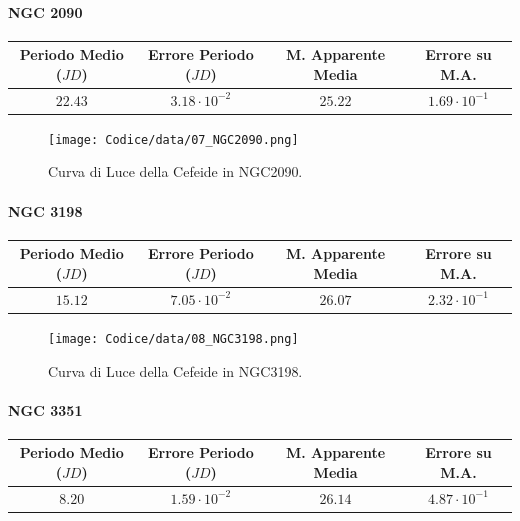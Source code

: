 \documentclass{article}
\newcommand{\e}[1]{\cdot 10^{#1}} %
\begin{document}
\paragraph{NGC 2090}
\begin{center}
  \begin{tabular}{cccc}
  \toprule
  Periodo Medio ($JD$) & Errore Periodo ($JD$) & M. Apparente Media &
                                                                  Errore
                                                                      su
                                                                      M.A. \\
  \midrule
  $22.43$ & $3.18\e{-2}$ & $25.22$ & $1.69\e{-1}$ \\
  \bottomrule
 \end{tabular}
\end{center}

\begin{figure}[H]
  \centering
  \texttt{[image: Codice/data/07\_NGC2090.png]}
  \caption{Curva di Luce della Cefeide in NGC2090.}
\end{figure}

\paragraph{NGC 3198}
\begin{center}
  \begin{tabular}{cccc}
  \toprule
  Periodo Medio ($JD$) & Errore Periodo ($JD$) & M. Apparente Media &
                                                                  Errore
                                                                      su
                                                                      M.A. \\
  \midrule
  $15.12$ & $7.05\e{-2}$ & $26.07$ & $2.32\e{-1}$ \\
  \bottomrule
 \end{tabular}
\end{center}

\begin{figure}[H]
  \centering
  \texttt{[image: Codice/data/08\_NGC3198.png]}
  \caption{Curva di Luce della Cefeide in NGC3198.}
\end{figure}

\paragraph{NGC 3351}
\begin{center}
  \begin{tabular}{cccc}
  \toprule
  Periodo Medio ($JD$) & Errore Periodo ($JD$) & M. Apparente Media &
                                                                  Errore
                                                                      su
                                                                      M.A. \\
  \midrule
  $8.20$ & $1.59\e{-2}$ & $26.14$ & $4.87\e{-1}$ \\
  \bottomrule
 \end{tabular}
\end{center}
\end{document}
